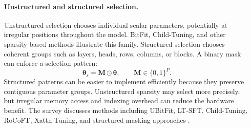 \paragraph{Unstructured and structured selection.}
Unstructured selection chooses individual scalar parameters, potentially at
irregular positions throughout the model. BitFit, Child-Tuning, and other
sparsity-based methods illustrate this family. Structured selection chooses
coherent groups such as layers, heads, rows, columns, or blocks. A binary
mask can enforce a selection pattern:
\begin{equation}
    \boldsymbol{\theta}_{s}
    =
    \mathbf{M}\odot\boldsymbol{\theta},
    \qquad
    \mathbf{M}\in\{0,1\}^{P}.
    \label{eq:peft-structured-mask}
\end{equation}
Structured patterns can be easier to implement efficiently because they
preserve contiguous parameter groups. Unstructured sparsity may select more
precisely, but irregular memory access and indexing overhead can reduce the
hardware benefit. The survey discusses methods including UBitFit, LT-SFT,
Child-Tuning, RoCoFT, Xattn Tuning, and structured masking approaches
\parencite{prottasha2025peft}.

